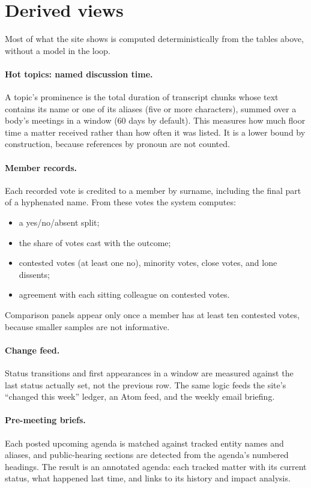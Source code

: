 \documentclass[11pt]{article}
\begin{document}
\section{Derived views}

Most of what the site shows is computed deterministically from the tables above, without
a model in the loop.

\paragraph{Hot topics: named discussion time.} A topic's prominence is the total duration
of transcript chunks whose text contains its name or one of its aliases (five or more
characters), summed over a body's meetings in a window (60 days by default). This
measures how much floor time a matter received rather than how often it was listed. It is
a lower bound by construction, because references by pronoun are not counted.

\paragraph{Member records.} Each recorded vote is credited to a member by surname,
including the final part of a hyphenated name. From these votes the system computes:
\begin{itemize}
  \item a yes/no/absent split;
  \item the share of votes cast with the outcome;
  \item contested votes (at least one no), minority votes, close votes, and lone dissents;
  \item agreement with each sitting colleague on contested votes.
\end{itemize}
Comparison panels appear only once a member has at least ten contested votes, because
smaller samples are not informative.

\paragraph{Change feed.} Status transitions and first appearances in a window are
measured against the last status actually set, not the previous row. The same logic feeds
the site's ``changed this week'' ledger, an Atom feed, and the weekly email briefing.

\paragraph{Pre-meeting briefs.} Each posted upcoming agenda is matched against tracked
entity names and aliases, and public-hearing sections are detected from the agenda's
numbered headings. The result is an annotated agenda: each tracked matter with its current
status, what happened last time, and links to its history and impact analysis.
\end{document}
